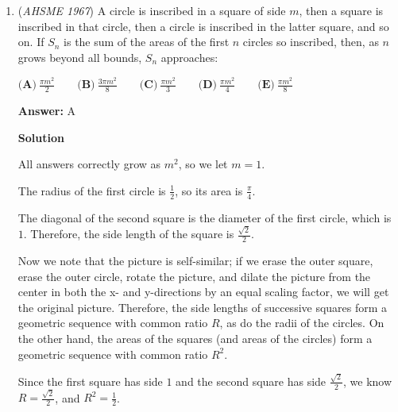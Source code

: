 \begin{enumerate}
 Taking the last two parts and moving everything to the left gives:

 $-2x + 5y + \frac{5}{3} = 0$

 Taking the first two parts and multiplying by $3$ gives $-2x + \frac{15}{2}y - 5 = 0$

 Solving both equations for $-2x$ and setting them equal to each other gives $5y + \frac{5}{3} = \frac{15}{2}y - 5$, which leads to $y = \frac{8}{3}$

 Plugging that in to $-2x + 5y + \frac{5}{3} = 0$ gives $x = \frac{15}{2}$.

 The area of the rectangle is $xy = 20$, or $\fbox{E}$.

 


	\item (\textit{AHSME 1967}) A circle is inscribed in a square of side $m$, then a square is inscribed in that  circle, then a circle is inscribed in the latter square, and so on.  If $S_n$ is the sum of the areas of the first $n$ circles so inscribed, then, as $n$ grows beyond all bounds, $S_n$ approaches:


 $\textbf{(A)}\ \frac{\pi m^2}{2}\qquad \textbf{(B)}\ \frac{3\pi m^2}{8}\qquad \textbf{(C)}\ \frac{\pi m^2}{3}\qquad \textbf{(D)}\ \frac{\pi m^2}{4}\qquad \textbf{(E)}\ \frac{\pi m^2}{8}$

 \textbf{Answer: }A



\textbf{Solution}

All answers correctly grow as $m^2$, so we let $m=1$.

 The radius of the first circle is $\frac{1}{2}$, so its area is $\frac{\pi}{4}$.

 The diagonal of the second square is the diameter of the first circle, which is $1$.  Therefore, the side length of the square is $\frac{\sqrt{2}}{2}$.

 Now we note that the picture is self-similar; if we erase the outer square, erase the outer circle, rotate the picture, and dilate the picture from the center in both the x- and y-directions by an equal scaling factor, we will get the original picture.  Therefore, the side lengths of successive squares form a geometric sequence with common ratio $R$, as do the radii of the circles.  On the other hand, the areas of the squares (and areas of the circles) form a geometric sequence with common ratio $R^2$.

 Since the first square has side $1$ and the second square has side $\frac{\sqrt{2}}{2}$, we know $R = \frac{\sqrt{2}}{2}$, and $R^2 = \frac{1}{2}$.  


\end{enumerate}
